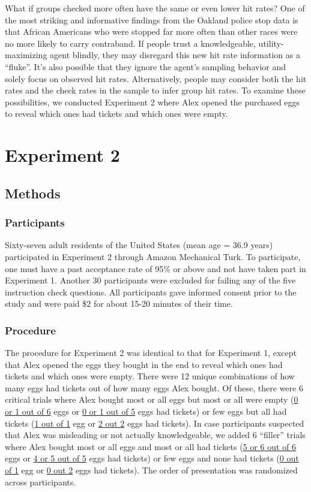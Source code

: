 \documentclass[10pt,letterpaper]{article}
\begin{document}
What if groups checked more often have the same or even lower hit rates? One of the most striking and informative findings from the Oakland police stop data is that African Americans who were stopped far more often than other races were no more likely to carry contraband. If people trust a knowledgeable, utility-maximizing agent blindly, they may disregard this new hit rate information as a ``fluke''. It's also possible that they ignore the agent's sampling behavior and solely focus on observed hit rates. Alternatively, people may consider both the hit rates and the check rates in the sample to infer group hit rates. To examine these possibilities, we conducted Experiment 2 where Alex opened the purchased eggs to reveal which ones had tickets and which ones were empty. 

\section{Experiment 2}

\subsection{Methods}

\subsubsection{Participants}
Sixty-seven adult residents of the United States (mean age = 36.9 years) participated in Experiment 2 through Amazon Mechanical Turk. To participate, one must have a past acceptance rate of 95\% or above and not have taken part in Experiment 1. Another 30 participants were excluded for failing any of the five instruction check questions. All participants gave informed consent prior to the study and were paid \$2 for about 15-20 minutes of their time. 

\subsubsection{Procedure} 
The procedure for Experiment 2 was identical to that for Experiment 1, except that Alex opened the eggs they bought in the end to reveal which ones had tickets and which ones were empty. There were 12 unique combinations of how many eggs had tickets out of how many eggs Alex bought. Of these, there were 6 critical trials where Alex bought most or all eggs but most or all were empty (\underline{0 or 1 out of 6} eggs or \underline{0 or 1 out of 5} eggs had tickets) or few eggs but all had tickets (\underline{1 out of 1} egg or \underline{2 out 2} eggs had tickets). In case participants suspected that Alex was misleading or not actually knowledgeable, we added 6 ``filler'' trials where Alex bought most or all eggs and most or all had tickets (\underline{5 or 6 out of 6} eggs or \underline{4 or 5 out of 5} eggs had tickets) or few eggs and none had tickets (\underline{0 out of 1} egg or \underline{0 out 2} eggs had tickets). The order of presentation was randomized across participants.
\end{document}
